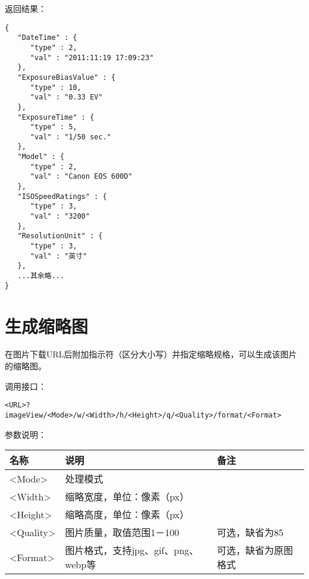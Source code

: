 \documentclass[11pt, oneside]{book}
\newcommand{\qpar}[1]{
\vspace{0.25em}
\noindent
#1\par
\vspace{0.25em}
}
\newcommand{\qqbox}[1]{\hspace{0.2em}\fbox{#1}\hspace{0.2em}}
\newcommand{\qtable}[1]{\footnotesize\vspace{0.5em}#1\vspace{0.5em}\normalsize}
\begin{document}
\begin{CJK*}{UTF8}{song}
\begin{sample}
    \qpar{返回结果：}
\begin{verbatim}
{
   "DateTime" : {
      "type" : 2,
      "val" : "2011:11:19 17:09:23"
   },
   "ExposureBiasValue" : {
      "type" : 10,
      "val" : "0.33 EV"
   },
   "ExposureTime" : {
      "type" : 5,
      "val" : "1/50 sec."
   },
   "Model" : {
      "type" : 2,
      "val" : "Canon EOS 600D"
   },
   "ISOSpeedRatings" : {
      "type" : 3,
      "val" : "3200"
   },
   "ResolutionUnit" : {
      "type" : 3,
      "val" : "英寸"
   },
   ...其余略...
}
\end{verbatim}
  \label{exif}
\end{sample}

\clearpage

\section{生成缩略图}

\qpar{在图片下载URL后附加\qqbox{imageView}指示符（区分大小写）并指定缩略规格，可以生成该图片的缩略图。}
\qpar{调用接口：}
\begin{lstlisting}[basicstyle=\ttfamily\footnotesize]
<URL>?imageView/<Mode>/w/<Width>/h/<Height>/q/<Quality>/format/<Format>
\end{lstlisting}


\qpar{参数说明：}
\qtable{
\def\arraystretch{2}
\begin{tabular}{|l|l|l|}
\hline
名称 & 说明 & 备注\\
\hline
\textless Mode\textgreater & 处理模式 & \\
\hline
\textless Width\textgreater & 缩略宽度，单位：像素（px） & \\
\hline
\textless Height\textgreater & 缩略高度，单位：像素（px） & \\
\hline
\textless Quality\textgreater & 图片质量，取值范围1－100 & 可选，缺省为85 \\
\hline
\textless Format\textgreater & 图片格式，支持jpg、gif、png、webp等 & 可选，缺省为原图格式 \\
\hline
\end{tabular}
}


\end{CJK*}
\end{document}
